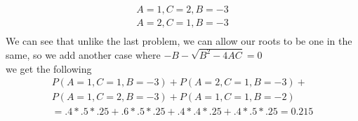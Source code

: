 \documentclass[11pt]{article}
\begin{document}
\begin{enumerate}
\begin{enumerate}
\begin{gather}
	A=1,C=2,B=-3\\
	A=2,C=1,B=-3\\
	\end{gather}
	We can see that unlike the last problem, we can allow our roots to be one in the same, so we add another case where $-B - \sqrt{B^2-4AC} = 0$\\
	we get the following
	\begin{gather}
	P(A=1,C=1,B=-3)+P(A=2,C=1,B=-3)+\\
	P(A=1,C=2,B=-3)+P(A=1,C=1,B=-2)\\
	= .4*.5*.25+.6*.5*.25+.4*.4*.25+.4*.5*.25 = 0.215
	\end{gather}
\end{enumerate}
\end{enumerate}
\end{document}

